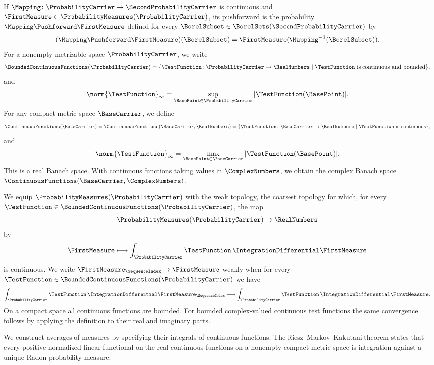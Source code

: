 If
$\Mapping \colon \ProbabilityCarrier \to \SecondProbabilityCarrier $
is continuous and
$\FirstMeasure \in\ProbabilityMeasures(\ProbabilityCarrier )$,
its pushforward is the probability
$\Mapping \Pushforward\FirstMeasure $
defined for every
$\BorelSubset\in\BorelSets(\SecondProbabilityCarrier)$
by
\[
 (\Mapping\Pushforward\FirstMeasure)(\BorelSubset)
 =\FirstMeasure(\Mapping^{-1}(\BorelSubset)).
\]
For a nonempty metrizable space
$\ProbabilityCarrier$,
we write
\[
 \BoundedContinuousFunctions(\ProbabilityCarrier)
 =\{\TestFunction\colon\ProbabilityCarrier\to\RealNumbers\mid
       \TestFunction\text{ is continuous and bounded}\},
\]
and
\[
 \norm{\TestFunction}_\infty=\sup_{\BasePoint\in\ProbabilityCarrier}|\TestFunction(\BasePoint)|.
\]
For any compact metric space
$\BaseCarrier$,
we define
\[
 \ContinuousFunctions(\BaseCarrier)=\ContinuousFunctions(\BaseCarrier,\RealNumbers)
 =\{\TestFunction\colon\BaseCarrier\to\RealNumbers\mid\TestFunction\text{ is continuous}\},
\]
and
\[
 \norm{\TestFunction}_\infty=\max_{\BasePoint\in\BaseCarrier}|\TestFunction(\BasePoint)|.
\]
This is a real Banach space.
With continuous functions taking values in
$\ComplexNumbers$,
we obtain the complex Banach space
$\ContinuousFunctions(\BaseCarrier,\ComplexNumbers)$.

We equip
$\ProbabilityMeasures(\ProbabilityCarrier)$
with the weak topology,
the coarsest topology for which,
for every
$\TestFunction\in\BoundedContinuousFunctions(\ProbabilityCarrier)$,
the map
\[
 \ProbabilityMeasures(\ProbabilityCarrier)\to\RealNumbers
 \]
 by
 \[\FirstMeasure\longmapsto\int_\ProbabilityCarrier\TestFunction\,
 \IntegrationDifferential\FirstMeasure
\]
is continuous.
We write
$\FirstMeasure_\SequenceIndex\to\FirstMeasure$
weakly when for every
$\TestFunction\in\BoundedContinuousFunctions(\ProbabilityCarrier)$
we have
\[
 \int_\ProbabilityCarrier\TestFunction\,\IntegrationDifferential\FirstMeasure_\SequenceIndex
 \longrightarrow
 \int_\ProbabilityCarrier\TestFunction\,\IntegrationDifferential\FirstMeasure.
\]
On a compact space all continuous functions are bounded.
For bounded complex-valued continuous test functions the same convergence follows by
applying the definition to their real and imaginary parts.

We construct averages of measures by specifying their integrals of continuous functions.
The Riesz--Markov--Kakutani theorem states that every positive normalized
linear functional on the real continuous functions on a nonempty compact
metric space is integration against a unique Radon probability measure.


